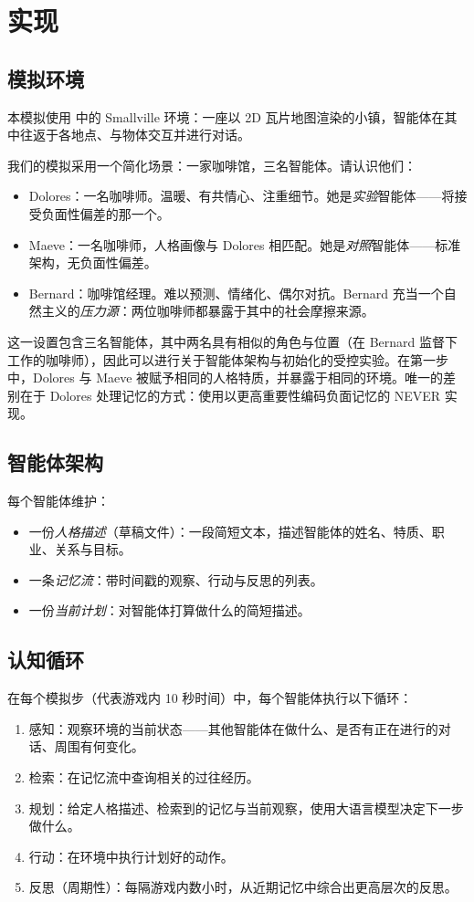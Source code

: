 \section{实现}

\subsection{模拟环境}

本模拟使用 \citet{park2023generative} 中的 Smallville 环境：一座以 2D 瓦片地图渲染的小镇，智能体在其中往返于各地点、与物体交互并进行对话。

我们的模拟采用一个简化场景：一家咖啡馆，三名智能体。请认识他们：
\begin{itemize}
    \item Dolores：一名咖啡师。温暖、有共情心、注重细节。她是\emph{实验}智能体——将接受负面性偏差的那一个。
    \item Maeve：一名咖啡师，人格画像与 Dolores 相匹配。她是\emph{对照}智能体——标准架构，无负面性偏差。
    \item Bernard：咖啡馆经理。难以预测、情绪化、偶尔对抗。Bernard 充当一个自然主义的\emph{压力源}：两位咖啡师都暴露于其中的社会摩擦来源。
\end{itemize}
%
这一设置包含三名智能体，其中两名具有相似的角色与位置（在 Bernard 监督下工作的咖啡师），因此可以进行关于智能体架构与初始化的受控实验。在第一步中，Dolores 与 Maeve 被赋予相同的人格特质，并暴露于相同的环境。唯一的差别在于 Dolores 处理记忆的方式：使用以更高重要性编码负面记忆的 NEVER 实现。

\subsection{智能体架构}

每个智能体维护：
\begin{itemize}
    \item 一份\textit{人格描述}（草稿文件）：一段简短文本，描述智能体的姓名、特质、职业、关系与目标。
    \item 一条\textit{记忆流}：带时间戳的观察、行动与反思的列表。
    \item 一份\textit{当前计划}：对智能体打算做什么的简短描述。
\end{itemize}

\subsection{认知循环}

在每个模拟步（代表游戏内 10 秒时间）中，每个智能体执行以下循环：
\begin{enumerate}
    \item 感知：观察环境的当前状态——其他智能体在做什么、是否有正在进行的对话、周围有何变化。
    \item 检索：在记忆流中查询相关的过往经历。
    \item 规划：给定人格描述、检索到的记忆与当前观察，使用大语言模型决定下一步做什么。
    \item 行动：在环境中执行计划好的动作。
    \item 反思（周期性）：每隔游戏内数小时，从近期记忆中综合出更高层次的反思。
\end{enumerate}

